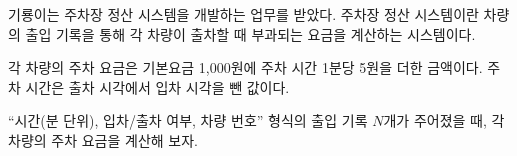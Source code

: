 기룡이는 주차장 정산 시스템을 개발하는 업무를 받았다.
주차장 정산 시스템이란 차량의 출입 기록을 통해 각 차량이 출차할 때 부과되는 요금을 계산하는 시스템이다.

각 차량의 주차 요금은 기본요금 1,000원에 주차 시간 1분당 5원을 더한 금액이다.
주차 시간은 출차 시각에서 입차 시각을 뺀 값이다.

``시간(분 단위), 입차/출차 여부, 차량 번호'' 형식의 출입 기록 $N$개가 주어졌을 때,
각 차량의 주차 요금을 계산해 보자.
